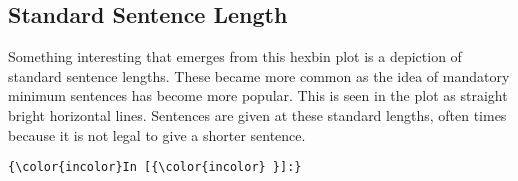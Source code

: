 \documentclass[11pt]{article}
\begin{document}
\hypertarget{standard-sentence-length}{%
\subsection{Standard Sentence Length}\label{standard-sentence-length}}

Something interesting that emerges from this hexbin plot is a depiction
of standard sentence lengths. These became more common as the idea of
mandatory minimum sentences has become more popular. This is seen in the
plot as straight bright horizontal lines. Sentences are given at these
standard lengths, often times because it is not legal to give a shorter
sentence.

    \begin{Verbatim}[commandchars=\\\{\}]
{\color{incolor}In [{\color{incolor} }]:} 
\end{Verbatim}


    
    
    
    
\end{document}
